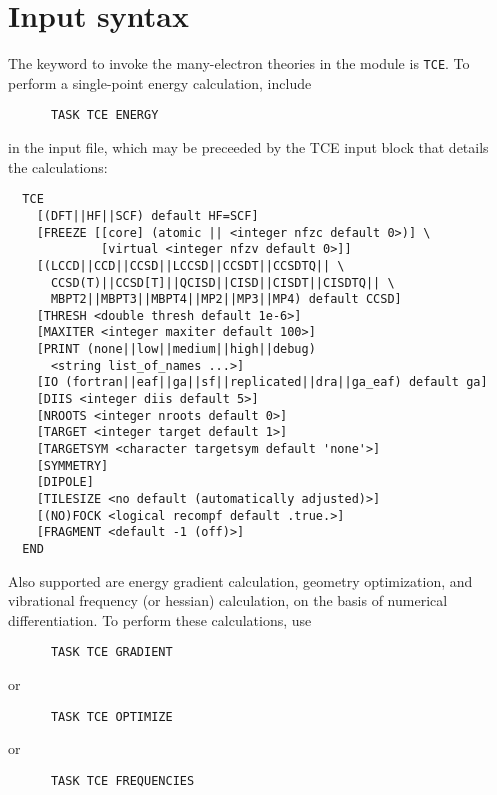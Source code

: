 \section{Input syntax}

The keyword to invoke the many-electron theories in the module is
\verb+TCE+.  To perform a single-point energy calculation, include
\begin{verbatim}
      TASK TCE ENERGY
\end{verbatim}
in the input file, which may be preceeded by the TCE input block
that details the calculations:
\begin{verbatim}
  TCE
    [(DFT||HF||SCF) default HF=SCF]
    [FREEZE [[core] (atomic || <integer nfzc default 0>)] \
             [virtual <integer nfzv default 0>]]
    [(LCCD||CCD||CCSD||LCCSD||CCSDT||CCSDTQ|| \
      CCSD(T)||CCSD[T]||QCISD||CISD||CISDT||CISDTQ|| \
      MBPT2||MBPT3||MBPT4||MP2||MP3||MP4) default CCSD]
    [THRESH <double thresh default 1e-6>]
    [MAXITER <integer maxiter default 100>]
    [PRINT (none||low||medium||high||debug)
      <string list_of_names ...>]
    [IO (fortran||eaf||ga||sf||replicated||dra||ga_eaf) default ga]
    [DIIS <integer diis default 5>]
    [NROOTS <integer nroots default 0>]
    [TARGET <integer target default 1>]
    [TARGETSYM <character targetsym default 'none'>]
    [SYMMETRY]
    [DIPOLE]
    [TILESIZE <no default (automatically adjusted)>]
    [(NO)FOCK <logical recompf default .true.>]
    [FRAGMENT <default -1 (off)>]
  END
\end{verbatim}
Also supported are energy gradient calculation, geometry optimization,
and vibrational frequency (or hessian) calculation, on the basis of
numerical differentiation.  To perform these calculations, use
\begin{verbatim}
      TASK TCE GRADIENT
\end{verbatim}
or
\begin{verbatim}
      TASK TCE OPTIMIZE
\end{verbatim}
or
\begin{verbatim}
      TASK TCE FREQUENCIES
\end{verbatim}

